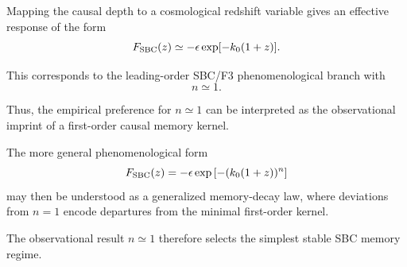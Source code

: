 Mapping the causal depth to a cosmological redshift variable gives an effective response of the form
\begin{equation}
F_{\rm SBC}(z)
\simeq
-\epsilon
\exp[-k_0(1+z)].
\end{equation}

This corresponds to the leading-order SBC/F3 phenomenological branch with
\begin{equation}
n\simeq 1.
\end{equation}

Thus, the empirical preference for \(n\simeq 1\) can be interpreted as the observational imprint of a first-order causal memory kernel.

The more general phenomenological form
\begin{equation}
F_{\rm SBC}(z)
=
-\epsilon
\exp\left[-(k_0(1+z))^n\right]
\end{equation}
may then be understood as a generalized memory-decay law, where deviations from \(n=1\) encode departures from the minimal first-order kernel.

The observational result \(n\simeq1\) therefore selects the simplest stable SBC memory regime.
